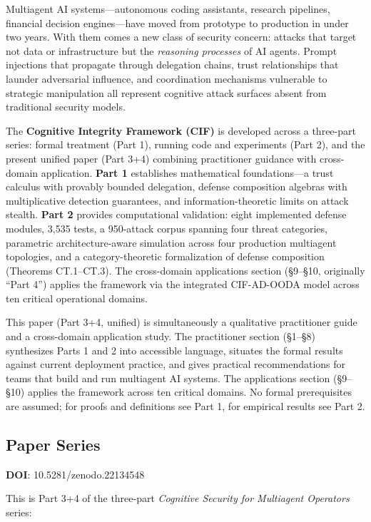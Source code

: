 \documentclass[
]{article}
\begin{document}
Multiagent AI systems---autonomous coding assistants, research
pipelines, financial decision engines---have moved from prototype to
production in under two years. With them comes a new class of security
concern: attacks that target not data or infrastructure but the
\emph{reasoning processes} of AI agents. Prompt injections that
propagate through delegation chains, trust relationships that launder
adversarial influence, and coordination mechanisms vulnerable to
strategic manipulation all represent cognitive attack surfaces absent
from traditional security models.

The \textbf{Cognitive Integrity Framework (CIF)} is developed across a
three-part series: formal treatment (Part 1), running code and
experiments (Part 2), and the present unified paper (Part 3+4) combining
practitioner guidance with cross-domain application. \textbf{Part 1}
establishes mathematical foundations---a trust calculus with provably
bounded delegation, defense composition algebras with multiplicative
detection guarantees, and information-theoretic limits on attack
stealth. \textbf{Part 2} provides computational validation: eight
implemented defense modules, 3,535 tests, a 950-attack corpus spanning
four threat categories, parametric architecture-aware simulation across
four production multiagent topologies, and a category-theoretic
formalization of defense composition (Theorems CT.1--CT.3). The
cross-domain applications section (§9--§10, originally ``Part 4'')
applies the framework via the integrated CIF-AD-OODA model across ten
critical operational domains.

This paper (Part 3+4, unified) is simultaneously a qualitative
practitioner guide and a cross-domain application study. The
practitioner section (§1--§8) synthesizes Parts 1 and 2 into accessible
language, situates the formal results against current deployment
practice, and gives practical recommendations for teams that build and
run multiagent AI systems. The applications section (§9--§10) applies
the framework across ten critical domains. No formal prerequisites are
assumed; for proofs and definitions see Part 1, for empirical results
see Part 2.

\subsection{Paper Series}\label{paper-series}

\textbf{DOI}: 10.5281/zenodo.22134548

This is Part 3+4 of the three-part \emph{Cognitive Security for
Multiagent Operators} series:
\end{document}
